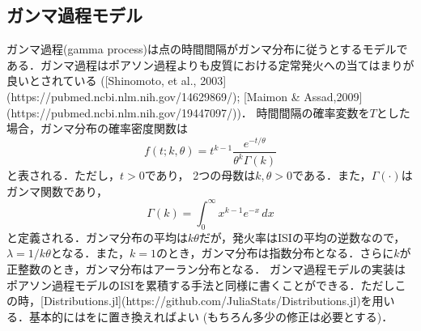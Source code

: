 \subsection{ガンマ過程モデル}ガンマ過程(gamma process)は点の時間間隔がガンマ分布に従うとするモデルである．ガンマ過程はポアソン過程よりも皮質における定常発火への当てはまりが良いとされている ([Shinomoto, et al., 2003](https://pubmed.ncbi.nlm.nih.gov/14629869/); [Maimon & Assad,2009](https://pubmed.ncbi.nlm.nih.gov/19447097/))．
時間間隔の確率変数を$T$とした場合，ガンマ分布の確率密度関数は
$$
\begin{equation}
f(t;k,\theta) =  t^{k-1}\frac{e^{-t/\theta}}{\theta^k\Gamma(k)}
\end{equation}
$$
と表される．ただし，$t > 0$であり， 2つの母数は$k, \theta > 0$である．また，$\Gamma (\cdot)$はガンマ関数であり，
$$
\begin{equation}
\Gamma (k)=\int _{0}^{\infty }x^{k-1}e^{-x}\,dx
\end{equation}
$$
と定義される．ガンマ分布の平均は$k\theta$だが，発火率はISIの平均の逆数なので，$\lambda=1/k\theta$となる．また，$k=1$のとき，ガンマ分布は指数分布となる．さらに$k$が正整数のとき，ガンマ分布はアーラン分布となる．
ガンマ過程モデルの実装はポアソン過程モデルのISIを累積する手法と同様に書くことができる．ただしこの時，[Distributions.jl](https://github.com/JuliaStats/Distributions.jl)を用いる．基本的にはをに置き換えればよい (もちろん多少の修正は必要とする)．